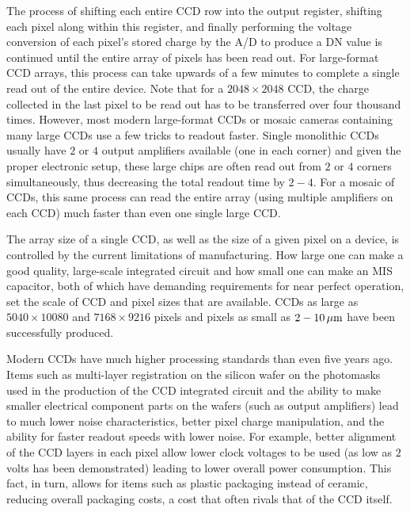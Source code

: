 \documentclass[a4paper,10pt]{article}
\begin{document}
{\noindent}The process of shifting each entire CCD row into the output register, shifting each pixel along within this register, and finally performing the voltage conversion of each pixel's stored charge by the A/D to produce a DN value is continued until the entire array of pixels has been read out. For large-format CCD arrays, this process can take upwards of a few minutes to complete a single read out of the entire device. Note that for a $2048\times2048$ CCD, the charge collected in the last pixel to be read out has to be transferred over four thousand times. However, most modern large-format CCDs or mosaic cameras containing many large CCDs use a few tricks to readout faster. Single monolithic CCDs usually have $2$ or $4$ output amplifiers available (one in each corner) and given the proper electronic setup, these large chips are often read out from $2$ or $4$ corners simultaneously, thus decreasing the total readout time by $2-4$. For a mosaic of CCDs, this same process can read the entire array (using multiple amplifiers on each CCD) much faster than even one single large CCD.

{\noindent}The array size of a single CCD, as well as the size of a given pixel on a device, is controlled by the current limitations of manufacturing. How large one can make a good quality, large-scale integrated circuit and how small one can make an MIS capacitor, both of which have demanding requirements for near perfect operation, set the scale of CCD and pixel sizes that are available. CCDs as large as $5040\times10080$ and $7168\times9216$ pixels and pixels as small as $2-10\,\mu{\rm m}$ have been successfully produced. 

{\noindent}Modern CCDs have much higher processing standards than even five years ago. Items such as multi-layer registration on the silicon wafer on the photomasks used in the production of the CCD integrated circuit and the ability to make smaller electrical component parts on the wafers (such as output amplifiers) lead to much lower noise characteristics, better pixel charge manipulation, and the ability for faster readout speeds with lower noise. For example, better alignment of the CCD layers in each pixel allow lower clock voltages to be used (as low as $2$ volts has been demonstrated) leading to lower overall power consumption. This fact, in turn, allows for items such as plastic packaging instead of ceramic, reducing overall packaging costs, a cost that often rivals that of the CCD itself.
\end{document}
